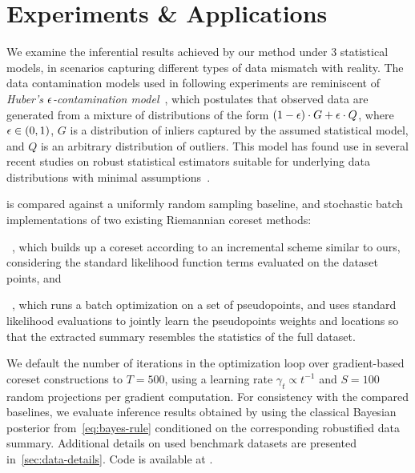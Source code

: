 \section{Experiments \& Applications}
\label{sec:evaluation}
\newcommand{\MYhref}[3][oxfordblue]{\href{#2}{\color{#1}{#3}}}%

We examine the inferential results achieved by our method under 3 statistical models, in scenarios capturing different types of data mismatch with reality. The data contamination models used in following experiments are reminiscent of \emph{Huber's $\epsilon$-contamination model}~\citep{huber92}, which postulates that observed data are generated from a mixture of distributions of the form $(1-\epsilon)\cdot G+ \epsilon\cdot Q$, where $\epsilon \in (0,1)$,  $G$ is a distribution of inliers captured by the assumed statistical model, and $Q$ is an arbitrary distribution of outliers. This model has found use in several recent studies on robust statistical estimators suitable for underlying data distributions with minimal assumptions~\citep{wei17, chen18}.

\bcores{} is compared against a uniformly random sampling baseline, and stochastic batch implementations of two existing Riemannian coreset methods: 
\benum[label={(\roman*)}]
	\item \sparsevi~\cite{campbell19neurips}, which builds up a coreset according to an incremental scheme similar to ours, considering the standard likelihood function terms evaluated on the dataset points, and 
	\item \psvi~\cite{psvi}, which runs a batch optimization on a set of pseudopoints, and uses standard likelihood evaluations to jointly learn the pseudopoints weights and locations so that the extracted summary resembles the statistics of the full dataset. 
\eenum


We default the number of iterations in the optimization loop over gradient-based coreset constructions to $ T = 500$, using a learning rate $ \gamma_t \propto t^{-1}$ and $S=100$ random projections per gradient computation. For consistency with the compared baselines, we evaluate inference results obtained by \bcores{} using the classical Bayesian posterior from~\cref{eq:bayes-rule} conditioned on the corresponding robustified data summary. Additional details on used benchmark datasets are presented in~\cref{sec:data-details}. Code is available at 	\MYhref{https://github.com/dionman/beta-cores}{https://github.com/dionman/beta-cores}.

